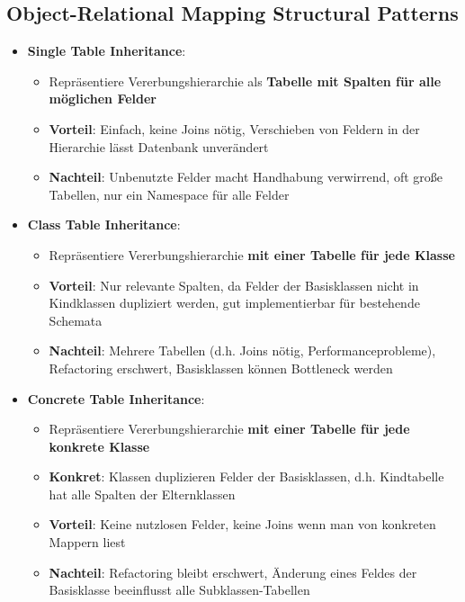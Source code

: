 \subsection{Object-Relational Mapping Structural Patterns}
\label{eap:sub:object_relational_mapping_structural_patterns}


\begin{itemize}
	\item \textbf{Single Table Inheritance}:
	\begin{itemize}
		\item Repräsentiere Vererbungshierarchie als \textbf{Tabelle mit Spalten für alle möglichen Felder}
		\item \textbf{Vorteil}: Einfach, keine Joins nötig, Verschieben von Feldern in der Hierarchie lässt Datenbank unverändert
		\item \textbf{Nachteil}: Unbenutzte Felder macht Handhabung verwirrend, oft große Tabellen, nur ein Namespace für alle Felder
	\end{itemize}
	\item \textbf{Class Table Inheritance}:
	\begin{itemize}
		\item Repräsentiere Vererbungshierarchie \textbf{mit einer Tabelle für jede Klasse}
		\item \textbf{Vorteil}: Nur relevante Spalten, da Felder der Basisklassen nicht in Kindklassen dupliziert werden, gut implementierbar für bestehende Schemata
		\item \textbf{Nachteil}: Mehrere Tabellen (d.h. Joins nötig, Performanceprobleme), Refactoring erschwert, Basisklassen können Bottleneck werden
	\end{itemize}
	\item \textbf{Concrete Table Inheritance}:
	\begin{itemize}
		\item Repräsentiere Vererbungshierarchie \textbf{mit einer Tabelle für jede konkrete Klasse}
		\item \textbf{Konkret}: Klassen duplizieren Felder der Basisklassen, d.h. Kindtabelle hat alle Spalten der Elternklassen
		\item \textbf{Vorteil}: Keine nutzlosen Felder, keine Joins wenn man von konkreten Mappern liest
		\item \textbf{Nachteil}: Refactoring bleibt erschwert, Änderung eines Feldes der Basisklasse beeinflusst alle Subklassen-Tabellen
	\end{itemize}
\end{itemize}